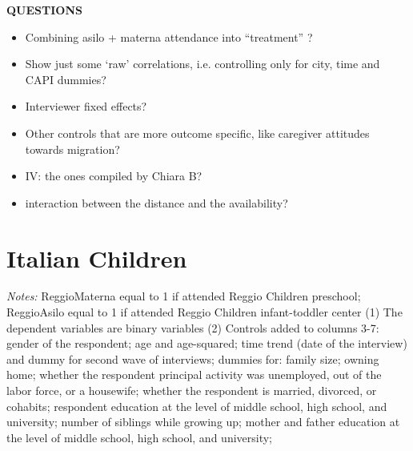 \documentclass[12pt,english]{article}
\begin{document}
\bigskip
\textbf{QUESTIONS}
\begin{itemize}
	\item Combining asilo + materna attendance into ``treatment'' ?
	\item Show just some `raw' correlations, i.e. controlling only for city, time and CAPI dummies?
	\item Interviewer fixed effects?
	\item Other controls that are more outcome specific, like caregiver attitudes towards migration?
	\vspace{3ex}
	\item IV: the ones compiled by Chiara B?
	\item interaction between the distance and the availability?
\end{itemize}

\section{Italian Children}

 {

\FloatBarrier
\begin{table}[htb!]
\begin{small}
.tex}
\end{small}
   \begin{tablenotes}
      \footnotesize
      \item \emph{Notes:} ReggioMaterna equal to 1 if attended Reggio Children preschool; ReggioAsilo equal to 1 if attended Reggio Children infant-toddler center (1) The dependent variables are binary variables (2) Controls added to columns 3-7: gender of the respondent; age and age-squared; time trend (date of the interview) and dummy for second wave of interviews; dummies for: family size; owning home; whether the respondent principal activity was unemployed, out of the labor force, or a housewife; whether the respondent is married, divorced, or cohabits; respondent education at the level of middle school, high school, and university; number of siblings while growing up; mother and father education at the level of middle school, high school, and university; 
    \end{tablenotes}
\end{table}

}

\pagebreak
\end{document}
